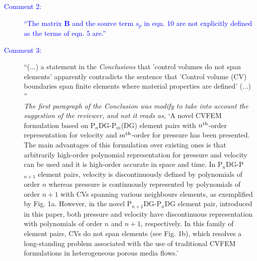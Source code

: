 \documentclass[12pts,a4paper,amsmath,amssymb,floatfix]{article}
\newcommand{\PN}[2][error]{P$_{#1}$DG-P$_{#2}$}
\newcommand{\PNDG}[2][error]{P$_{#1}$DG-P$_{#2}$DG}
\newcommand{\blue}{\textcolor{blue}}
\begin{document}
\begin{description}
\item[\blue{Comment 2:}] \blue{``The matrix $\mathbf{B}$ and the source term $s_{p}$ in eqn. 10 are not explicitly defined as the terms of eqn. 5 are.''}\\
\item[\blue{Comment 3:}] ``(...) a statement in the {\it Conclusions} that 'control volumes do not span elements' apparently contradicts the sentence that 'Control volume (CV) boundaries span finite elements where material properties	are defined' (...) ''\\
{\it The first paragraph of the Conclusion was modify to take into account the suggestion of the reviewer, and not it reads as,} `A novel CVFEM formulation based on \PN[n]{m}(DG) element pairs with $n^{\rm th}$-order representation for velocity and $m^{\rm th}$-order for pressure has been presented. The main advantages of this formulation over existing ones is that arbitrarily high-order polynomial representation for pressure and velocity can be used and it is high-order accurate in space and time. In \PN[n]{n+1} element pairs, velocity is discontinuously defined by polynomials of order $n$ whereas pressure is continuously represented by polynomials of order $n+1$ with CVs spanning various neighbours elements, as exemplified by Fig. 1a. However, in the novel \PNDG[n+1]{n} element pair, introduced in this paper, both pressure and velocity have discontinuous representation with polynomials of order $n$ and $n+1$, respectively. In this family of element pairs, CVs do not span elements (see Fig. 1b), which resolves a long-standing problem associated with the use of traditional CVFEM formulations in heterogeneous porous media flows.'


\end{description}
\end{document}

